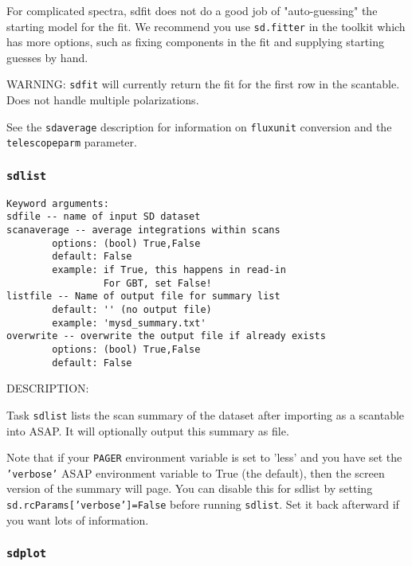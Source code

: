     For complicated spectra, sdfit does not do a good job of
    "auto-guessing" the starting model for the fit.  We recommend
    you use {\tt sd.fitter} in the toolkit which has more options, such
    as fixing components in the fit and supplying starting guesses
    by hand.

    WARNING: {\tt sdfit} will currently return the fit for the first
    row in the scantable.  Does not handle multiple polarizations.

    See the {\tt sdaverage} description for information on {\tt fluxunit} 
    conversion and the {\tt telescopeparm} parameter.


\subsubsection{{\tt sdlist}}
\label{section:sd.sdtasks.tasks.sdlist}

\begin{verbatim}
Keyword arguments:
sdfile -- name of input SD dataset
scanaverage -- average integrations within scans
        options: (bool) True,False
        default: False
        example: if True, this happens in read-in
                 For GBT, set False!
listfile -- Name of output file for summary list
        default: '' (no output file)
        example: 'mysd_summary.txt'
overwrite -- overwrite the output file if already exists
        options: (bool) True,False
        default: False
\end{verbatim}
    
    DESCRIPTION:
    
    Task {\tt sdlist} lists the scan summary of the dataset after importing
    as a scantable into ASAP.  It will optionally output this summary
    as file.
    
    Note that if your {\tt PAGER} environment variable is set to 'less' and
    you have set the {\tt 'verbose'} ASAP environment variable to True
    (the default), then the screen version of the summary will page.
    You can disable this for sdlist by setting
         {\tt sd.rcParams['verbose']=False}
    before running {\tt sdlist}.  Set it back afterward if you want lots
    of information.

\subsubsection{{\tt sdplot}}
\label{section:sd.sdtasks.tasks.sdplot}


